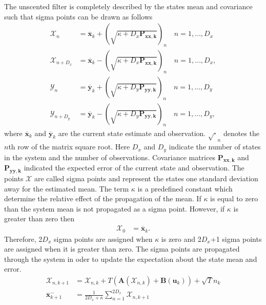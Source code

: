 The unscented filter is completely described by the states mean and covariance such that sigma points can be drawn as follows\begin{align}
\label{eqn: Unscented_Transform1}
\mathbf{\mathcal{X}}_{n} &= \mathbf{\overline{x}}_{k} + (\sqrt{\kappa+D_{x}\mathbf{P_{xx,k}}})_{n} \quad n=1,\hdots,D_x\\
\label{eqn: Unscented_Transform2}
\mathbf{\mathcal{X}}_{n+D_{x}} &= \mathbf{\overline{x}}_{k} - (\sqrt{\kappa+D_{x}\mathbf{P_{xx,k}}})_{n} \quad n=1,\hdots,D_x,\\
\label{eqn: Unscented_TransformY1}
\mathbf{\mathcal{Y}}_{n} &= \mathbf{\overline{y}}_{k} + (\sqrt{\kappa+D_{y}\mathbf{P_{yy,k}}})_{n} \quad n=1,\hdots,D_y\\
\label{eqn: Unscented_TransformY2}
\mathbf{\mathcal{Y}}_{n+D_{y}} &= \mathbf{\overline{y}}_{k} - (\sqrt{\kappa+D_{y}\mathbf{P_{yy,k}}})_{n} \quad n=1,\hdots,D_y,
\end{align} where $\mathbf{\overline{x}}_{k}$ and $\mathbf{\overline{y}}_{k}$ are the current state estimate and observation. $\sqrt{\cdot}_{n}$ denotes the $n$th row of the matrix square root. Here $D_{x}$ and $D_{y}$ indicate the number of states in the system and the number of observations. Covariance matrices $\mathbf{P_{xx,k}}$ and $\mathbf{P_{yy,k}}$ indicated the expected error of the current state and observation. The points $\mathbf{\mathcal{X}}$ are called sigma points and represent the states one standard deviation away for the estimated mean. The term $\kappa$ is a predefined constant which determine the relative effect of the propagation of the mean. If $\kappa$ is equal to zero than the system mean is not propagated as a sigma point. However, if $\kappa$ is greater than zero then \begin{align}
\mathbf{\mathcal{X}}_{0} &= \mathbf{\overline{x}}_{k}.
\end{align} Therefore, 2$D_{x}$ sigma points are assigned when $\kappa$ is zero and 2$D_{x}$+1 sigma points are assigned when it is greater than zero. The sigma points are propagated through the system in oder to update the expectation about the state mean and error. \begin{align}%
\mathbf{\mathcal{X}}_{n,k+1} &= \mathbf{\mathcal{X}}_{n,k}+ T(\mathbf{A}(\mathbf{\mathcal{X}}_{n,k}) +\mathbf{B}(\mathbf{u}_{k})) +\sqrt{T}{n}_{k}\\
\overline{\mathbf{x}}_{k+1}^{-} &= \frac{1}{2D_{x}+\kappa}\sum_{n=1}^{2D_{x}} \mathbf{\mathcal{X}}_{n,k+1}\\

\end{align}
